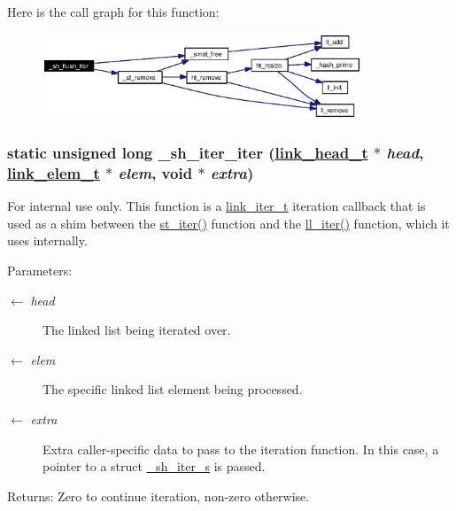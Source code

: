 Here is the call graph for this function:\begin{figure}[H]
\begin{center}
\leavevmode
\includegraphics[width=270pt]{group__dbprim__smat_ga28_cgraph}
\end{center}
\end{figure}
\hypertarget{group__dbprim__smat_ga29}{
\subsubsection[\_\-sh\_\-iter\_\-iter]{\setlength{\rightskip}{0pt plus 5cm}static unsigned long \_\-sh\_\-iter\_\-iter (\hyperlink{struct__link__head__s}{link\_\-head\_\-t} $\ast$ {\em head}, \hyperlink{struct__link__elem__s}{link\_\-elem\_\-t} $\ast$ {\em elem}, void $\ast$ {\em extra})}}
\label{group__dbprim__smat_ga29}


\begin{Desc}
\item[For internal use only.]
This function is a \hyperlink{group__dbprim__link_ga2}{link\_\-iter\_\-t} iteration callback that is used as a shim between the \hyperlink{group__dbprim__smat_ga16}{st\_\-iter()} function and the \hyperlink{group__dbprim__link_ga10}{ll\_\-iter()} function, which it uses internally.

\begin{Desc}
\item[Parameters:]
\begin{description}
\item[\mbox{$\leftarrow$} {\em head}]The linked list being iterated over. \item[\mbox{$\leftarrow$} {\em elem}]The specific linked list element being processed. \item[\mbox{$\leftarrow$} {\em extra}]Extra caller-specific data to pass to the iteration function. In this case, a pointer to a struct \hyperlink{struct__sh__iter__s}{\_\-sh\_\-iter\_\-s} is passed.\end{description}
\end{Desc}
\begin{Desc}
\item[Returns:]Zero to continue iteration, non-zero otherwise.\end{Desc}
\end{Desc}


